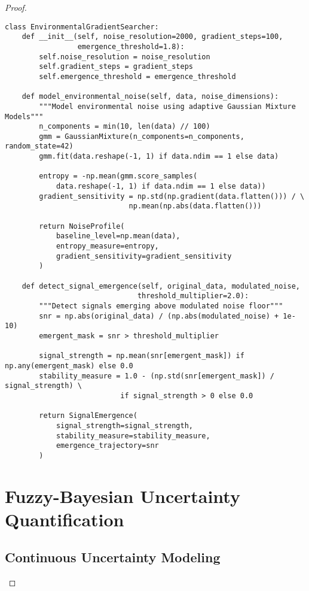 \documentclass[12pt,a4paper]{article}
\begin{document}
\begin{proof}
\begin{lstlisting}[style=pythonstyle, caption=Environmental Gradient Search Implementation]
class EnvironmentalGradientSearcher:
    def __init__(self, noise_resolution=2000, gradient_steps=100, 
                 emergence_threshold=1.8):
        self.noise_resolution = noise_resolution
        self.gradient_steps = gradient_steps  
        self.emergence_threshold = emergence_threshold
        
    def model_environmental_noise(self, data, noise_dimensions):
        """Model environmental noise using adaptive Gaussian Mixture Models"""
        n_components = min(10, len(data) // 100)
        gmm = GaussianMixture(n_components=n_components, random_state=42)
        gmm.fit(data.reshape(-1, 1) if data.ndim == 1 else data)
        
        entropy = -np.mean(gmm.score_samples(
            data.reshape(-1, 1) if data.ndim == 1 else data))
        gradient_sensitivity = np.std(np.gradient(data.flatten())) / \
                             np.mean(np.abs(data.flatten()))
        
        return NoiseProfile(
            baseline_level=np.mean(data),
            entropy_measure=entropy,
            gradient_sensitivity=gradient_sensitivity
        )
    
    def detect_signal_emergence(self, original_data, modulated_noise, 
                               threshold_multiplier=2.0):
        """Detect signals emerging above modulated noise floor"""
        snr = np.abs(original_data) / (np.abs(modulated_noise) + 1e-10)
        emergent_mask = snr > threshold_multiplier
        
        signal_strength = np.mean(snr[emergent_mask]) if np.any(emergent_mask) else 0.0
        stability_measure = 1.0 - (np.std(snr[emergent_mask]) / signal_strength) \
                           if signal_strength > 0 else 0.0
        
        return SignalEmergence(
            signal_strength=signal_strength,
            stability_measure=stability_measure,
            emergence_trajectory=snr
        )
\end{lstlisting}

\section{Fuzzy-Bayesian Uncertainty Quantification}

\subsection{Continuous Uncertainty Modeling}


\end{proof}
\end{document}
